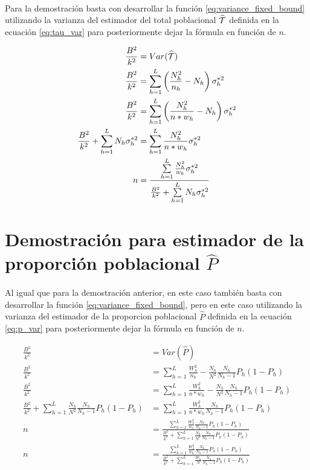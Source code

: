 \documentclass{article}
\begin{document}
    \paragraph{}
    Para la demostración basta con desarrollar la función \eqref{eq:variance_fixed_bound} utilizando la varianza del estimador del total poblacional $\widehat{\mathcal{T}}$ definida en la ecuación \eqref{eq:tau_var} para posteriormente dejar la fórmula en función de $n$.

    \begin{align}
      \frac{B^2}{k^2} &= Var(\widehat{\mathcal{T}}) \\
      \frac{B^2}{k^2} &= \sum\limits_{h=1}^L\left(\frac{N_h^2}{n_h}- N_h\right)\sigma_h^{*2} \\
      \frac{B^2}{k^2} &= \sum\limits_{h=1}^L\left(\frac{N_h^2}{n*w_h}- N_h\right)\sigma_h^{*2} \\
      \frac{B^2}{k^2} + \sum\limits_{h=1}^L N_h \sigma_h^{*2} &=  \sum\limits_{h=1}^L\frac{N_h^2}{n*w_h}\sigma_h^{*2} \\
      n &=  \frac{\sum\limits_{h=1}^L\frac{N_h^2}{w_h}\sigma_h^{*2}}{\frac{B^2}{k^2} + \sum\limits_{h=1}^L N_h \sigma_h^{*2}}
    \end{align}

  \section{Demostración para estimador de la proporción poblacional $\widehat{P}$}
  \label{sec:dem2}

    \paragraph{}
    Al igual que para la demostración anterior, en este caso también basta con desarrollar la función \eqref{eq:variance_fixed_bound}, pero en este caso utilizando la varianza del estimador de la proporcion poblacional $\widehat{P}$ definida en la ecuación \eqref{eq:p_var} para posteriormente dejar la fórmula en función de $n$.

    \begin{align}
      \frac{B^2}{k^2} &= Var(\widehat{P}) \\
      \frac{B^2}{k^2} &= \sum\limits_{h=1}^L\frac{W_h^2}{n_h} - \frac{N_h}{N^2}\frac{N_h}{N_h-1}P_h(1-P_h) \\
      \frac{B^2}{k^2} &= \sum\limits_{h=1}^L\frac{W_h^2}{n*w_h} - \frac{N_h}{N^2}\frac{N_h}{N_h-1}P_h(1-P_h) \\
      \frac{B^2}{k^2} + \sum\limits_{h=1}^L\frac{N_h}{N^2}\frac{N_h}{N_h-1}P_h(1-P_h) &= \sum\limits_{h=1}^L\frac{W_h^2}{n*w_h}\frac{N_h}{N_h-1}P_h(1-P_h) \\
      n &= \frac{
        \sum\limits_{h=1}^L\frac{W_h^2}{w_h}\frac{N_h}{N_h-1}P_h(1-P_h)
      }{
        \frac{B^2}{k^2} + \sum\limits_{h=1}^L\frac{N_h}{N^2}\frac{N_h}{N_h-1}P_h(1-P_h)
      } \\
      n &= \frac{
        \sum\limits_{h=1}^L\frac{W_h^2}{w_h}\frac{N_h}{N_h-1}P_h(1-P_h)
      }{\frac{B^2}{k^2} + \sum\limits_{h=1}^L\frac{W_h}{N}\frac{N_h}{N_h-1}P_h(1-P_h)
      }
    \end{align}
\end{document}
